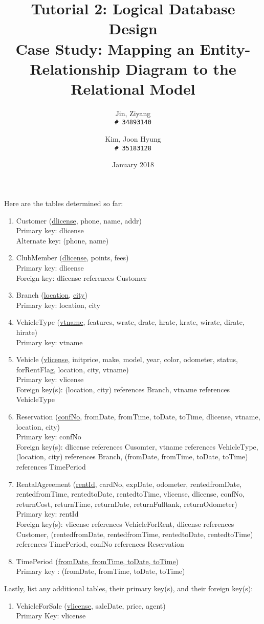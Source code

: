 \documentclass{article}
\title{%
	Tutorial 2: Logical Database Design \\
	\large Case Study: Mapping an Entity-Relationship Diagram to the Relational Model}
\author{
	Jin, Ziyang\\
	\texttt{\# 34893140}
	\and
	Kim, Joon Hyung\\
	\texttt{\# 35183128}
}
\date{January 2018}
\begin{document}
	\maketitle
	Here are the tables determined so far:
	\begin{enumerate}
		\item Customer (\underline{dlicense}, phone, name, addr) \\ 
			Primary key: dlicense \\ 
			Alternate key: (phone, name)

		\item ClubMember (\underline{dlicense}, points, fees)\\
			Primary key: dlicense \\
			Foreign key: dlicense references Customer

		\item Branch (\underline{location}, \underline{city}) \\
			Primary key: location, city

		\item VehicleType (\underline{vtname}, features, wrate, drate, hrate, krate, wirate, dirate, hirate) \\
			Primary key: vtname

		\item Vehicle (\underline{vlicense}, initprice, make, model, year, color, odometer, status, forRentFlag, location, city, vtname) \\
			Primary key: vlicense \\
			Foreign key(s): (location, city) references Branch, vtname references VehicleType

		\item Reservation (\underline{confNo}, fromDate, fromTime, toDate, toTime, dlicense, vtname, location, city)\\
			Primary key: confNo \\
			Foreign key(s): dlicense references Cusomter, vtname references VehicleType, (location, city) references Branch, (fromDate, fromTime, toDate, toTime) references TimePeriod

		\item RentalAgreement (\underline{rentId}, cardNo, expDate, odometer, rentedfromDate, rentedfromTime,
			rentedtoDate, rentedtoTime, vlicense, dlicense, confNo, returnCost, returnTime, returnDate, returnFulltank, returnOdometer) \\
			Primary key: rentId \\
			Foreign key(s): vlicense references VehicleForRent, dlicense references Customer, (rentedfromDate, rentedfromTime, rentedtoDate, rentedtoTime) references TimePeriod, confNo references Reservation

		\item TimePeriod (\underline{fromDate, fromTime, toDate, toTime}) \\
			Primary key : (fromDate, fromTime, toDate, toTime)

	\end{enumerate}
	Lastly, list any additional tables, their primary key(s), and their foreign key(s):
	\begin{enumerate}
		\item VehicleForSale (\underline{vlicense}, saleDate, price, agent) \\
			Primary Key: vlicense
	\end{enumerate}
	
\end{document}

